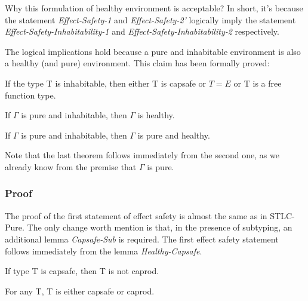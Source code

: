 Why this formulation of healthy environment is acceptable? In short,
it's because the statement \emph{Effect-Safety-1} and
\emph{Effect-Safety-2'} logically imply the statement
\emph{Effect-Safety-Inhabitability-1} and
\emph{Effect-Safety-Inhabitability-2} respectively.

The logical implications hold because a pure and inhabitable
environment is also a healthy (and pure) environment. This claim has
been formally proved:

\begin{lemma}
  If the type T is inhabitable, then either T is capsafe or $T = E$ or
  T is a free function type.
\end{lemma}

\begin{theorem}
  If $\Gamma$ is pure and inhabitable, then $\Gamma$ is healthy.
\end{theorem}

\begin{theorem}
  If $\Gamma$ is pure and inhabitable, then $\Gamma$ is pure and
  healthy.
\end{theorem}

Note that the last theorem follows immediately from the second one, as
we already know from the premise that $\Gamma$ is pure.


\subsubsection{Proof}

The proof of the first statement of effect safety is almost the same
as in STLC-Pure. The only change worth mention is that, in the
presence of subtyping, an additional lemma \emph{Capsafe-Sub} is
required.  The first effect safety statement follows immediately from
the lemma \emph{Healthy-Capsafe}.

\begin{lemma}
 If type T is capsafe, then T is not caprod.
\end{lemma}

\begin{lemma}
 For any T, T is either capsafe or caprod.
\end{lemma}

